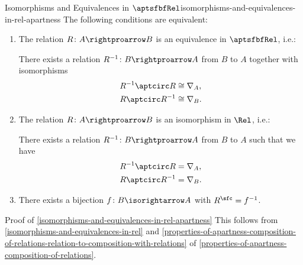 \begin{proposition}{Isomorphisms and Equivalences in $\aptsfbfRel$}{isomorphisms-and-equivalences-in-rel-apartness}%
    The following conditions are equivalent:
    \begin{enumerate}
        \item\label{isomorphisms-and-equivalences-in-rel-apartness-1}The relation $R\colon A\rightproarrow B$ is an equivalence in $\aptsfbfRel$, i.e.:
            \begin{itemize}
                \itemstar There exists a relation $R^{-1}\colon B\rightproarrow A$ from $B$ to $A$ together with isomorphisms
                    \begin{align*}
                        R^{-1}\aptcirc R &\cong \nabla_{A},\\
                        R\aptcirc R^{-1} &\cong \nabla_{B}.
                    \end{align*}
            \end{itemize}
        \item\label{isomorphisms-and-equivalences-in-rel-apartness-2}The relation $R\colon A\rightproarrow B$ is an isomorphism in $\Rel$, i.e.:
            \begin{itemize}
                \itemstar There exists a relation $R^{-1}\colon B\rightproarrow A$ from $B$ to $A$ such that we have
                    \begin{align*}
                        R^{-1}\aptcirc R &= \nabla_{A},\\
                        R\aptcirc R^{-1} &= \nabla_{B}.
                    \end{align*}
            \end{itemize}
        \item\label{isomorphisms-and-equivalences-in-rel-apartness-3}There exists a bijection $f\colon B\isorightarrow A$ with $R^{\sfc}=f^{-1}$.
    \end{enumerate}
\end{proposition}
\begin{Proof}{Proof of \cref{isomorphisms-and-equivalences-in-rel-apartness}}%
    This follows from \cref{isomorphisms-and-equivalences-in-rel} and \cref{properties-of-apartness-composition-of-relations-relation-to-composition-with-relations} of \cref{properties-of-apartness-composition-of-relations}.
\end{Proof}
